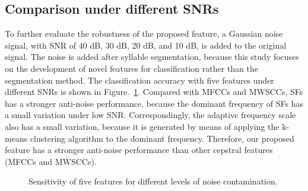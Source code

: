 \begin{table}[htb!]
\centering
\caption{Classification accuracy (\%) for classifying different number of frog species with four feature sets.}
\label{tab:manySpecies}
\end{table}


\subsection{Comparison under different SNRs}
To further evaluate the robustness of the proposed feature, a Gaussian noise signal, with SNR of 40 dB, 30 dB, 20 dB, and 10 dB, is added to the original signal. The noise is added after syllable segmentation, because this study focuses on the development of novel features for classification rather than the segmentation method. The classification accuracy with five features under different SNRs is shown in Figure.~\ref{fig:snr}. Compared with MFCCs and MWSCCs, SFs has a stronger anti-noise performance, because the dominant frequency of SFs has a small variation under low SNR. Correspondingly, the adaptive frequency scale also has a small variation, because it is generated by means of applying the k-means clustering algorithm to the dominant frequency. Therefore, our proposed feature has a stronger anti-noise performance than other cepstral features (MFCCs and MWSCCs). 

\begin{figure}[htb!] %
\caption{Sensitivity of five features for
different levels of noise contamination.}
\label{fig:snr} 
\end{figure}

